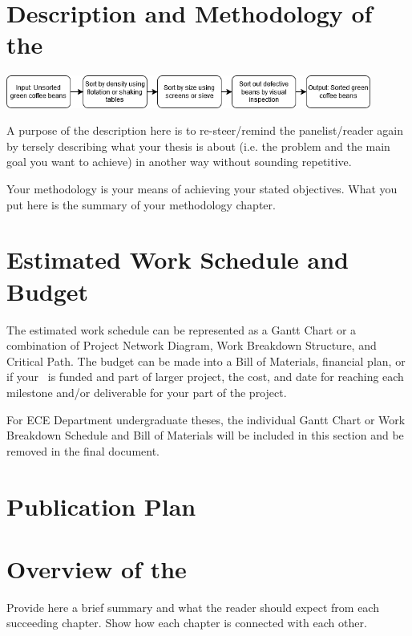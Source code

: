 \section{Description and Methodology of the \documentType}

\begin{center}
\includegraphics[width=0.9\textwidth]{figure/manual_sorting.png} 
\end{center}
A purpose of the description here is to re-steer/remind the panelist/reader again by tersely describing what your thesis is about (i.e. the problem and the main goal you want to achieve) in another way without sounding repetitive. 

Your methodology is your means of achieving your stated objectives. What you put here is the summary of your methodology chapter.



\graytx{\blindtext}


\ifFinished
\else

\section{Estimated Work Schedule and Budget}

The estimated work schedule can be represented as a Gantt Chart or a combination of Project Network Diagram, Work Breakdown Structure, and Critical Path.  The budget can be made into a Bill of Materials, financial plan, or if your \documentType \ is funded and part of larger project, the cost, and date for reaching each milestone and/or deliverable for your part of the project.

For ECE Department undergraduate theses, the individual Gantt Chart or Work Breakdown Schedule and Bill of Materials will be included in this section and be removed in the final document.

\graytx{\blindtext}

\ifPhD
\section{Publication Plan}
\graytx{\blindtext}
\fi

\fi


\section{Overview of the \documentType}

Provide here a brief summary and what the reader should expect from each succeeding chapter.  Show how each chapter is connected with each other.

